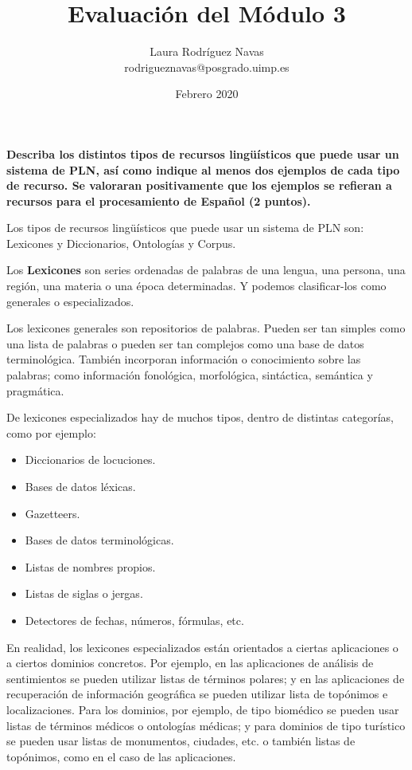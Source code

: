 \documentclass[11pt]{exam}
\title{Evaluación del Módulo 3}
\author{Laura Rodríguez Navas \\ rodrigueznavas@posgrado.uimp.es}
\date{Febrero 2020}
\begin{document}
\maketitle

\begin{questions}
	
{\bf \question Describa los distintos tipos de recursos lingüísticos que puede usar un sistema de PLN, así como indique al menos dos ejemplos de cada tipo de recurso. Se valoraran positivamente que los ejemplos se refieran a recursos para el procesamiento de Español (2 puntos).}

Los tipos de recursos lingüísticos que puede usar un sistema de PLN son: Lexicones y Diccionarios, Ontologías y Corpus.

Los {\bf Lexicones} son series ordenadas de palabras de una lengua, una persona, una región, una materia o una época determinadas. Y podemos clasificar-los como generales o especializados.

Los lexicones generales son repositorios de palabras. Pueden ser tan simples como una lista de palabras o pueden ser tan complejos como una base de datos terminológica. También incorporan información o conocimiento sobre las palabras; como información fonológica, morfológica, sintáctica, semántica y pragmática.

De lexicones especializados hay de muchos tipos, dentro de distintas categorías, como por ejemplo:

\begin{itemize}
	\item Diccionarios de locuciones.
	\item Bases de datos léxicas.
	\item Gazetteers.
	\item Bases de datos terminológicas.
	\item Listas de nombres propios.
	\item Listas de siglas o jergas.
	\item Detectores de fechas, números, fórmulas, etc.
\end{itemize}

En realidad, los lexicones especializados están orientados a ciertas aplicaciones o a ciertos dominios concretos. Por ejemplo, en las aplicaciones de análisis de sentimientos se pueden utilizar listas de términos polares; y en las aplicaciones de recuperación de información geográfica se pueden utilizar lista de topónimos e localizaciones. Para los dominios, por ejemplo, de tipo biomédico se pueden usar listas de términos médicos o ontologías médicas; y para dominios de tipo turístico se pueden usar listas de monumentos, ciudades, etc. o también listas de topónimos, como en el caso de las aplicaciones.


\end{questions}
\end{document}
